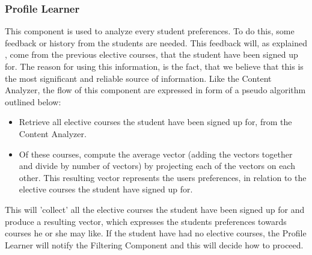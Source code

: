 \subsubsection{Profile Learner}
This component is used to analyze every student preferences. To do this, some feedback or history from the students are needed. This feedback will, as explained , come from the previous elective courses, that the student have been signed up for. The reason for using this information, is the fact, that we believe that this is the most significant and reliable source of information. Like the Content Analyzer, the flow of this component are expressed in form of a pseudo algorithm outlined below:
\begin{itemize}
	\item Retrieve all elective courses the student have been signed up for, from the Content Analyzer.
	\item Of these courses, compute the average vector (adding the vectors together and divide by number of vectors) by projecting each of the vectors on each other. This resulting vector represents the users preferences, in relation to the elective courses the student have signed up for. 
\end{itemize}
This will 'collect' all the elective courses the student have been signed up for and produce a resulting vector, which expresses the students preferences towards courses he or she may like. If the student have had no elective courses, the Profile Learner will notify the Filtering Component and this will decide how to proceed. 

